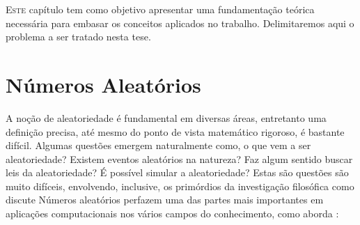 
  \lettrine{E}{ste} capítulo tem como objetivo apresentar uma fundamentação teórica necessária para embasar os conceitos aplicados no trabalho.
Delimitaremos aqui o problema a ser tratado nesta tese.

\section{Números Aleatórios} %
A noção de aleatoriedade é fundamental em diversas áreas, entretanto uma definição precisa, até mesmo do ponto de vista matemático rigoroso, é bastante difícil. Algumas questões emergem naturalmente como, o que vem a ser aleatoriedade? Existem eventos aleatórios na natureza? Faz algum sentido buscar leis da aleatoriedade? É possível simular a aleatoriedade? Estas são questões são muito difíceis, envolvendo, inclusive, os primórdios da investigação filosófica como discute \citep{Volchan:02}
Números aleatórios perfazem uma das partes mais importantes em aplicações computacionais nos vários campos do conhecimento, como aborda  \citep{Knuth:98}:
